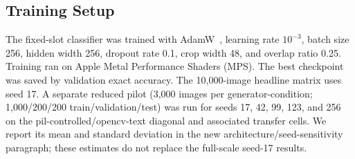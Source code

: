 \documentclass[pdflatex,sn-mathphys-num,iicol]{sn-jnl}
\begin{document}
\begin{table}[!htbp]
\centering
\caption{Full-scale benchmark configuration across all four generator families.
All distortion parameters are verified at the pixel level via the honesty
verifier (Section~\ref{sec:honesty}). This constitutes the CAPTCHA-X benchmark.}
\label{tab:benchmark}
\end{table}

\subsection{Training Setup}

The fixed-slot classifier was trained with AdamW~\cite{loshchilov2019decoupled}, learning rate $10^{-3}$, batch size 256, hidden width 256, dropout rate 0.1, crop width 48, and overlap ratio 0.25. Training ran on Apple Metal Performance Shaders (MPS). The best checkpoint was saved by validation exact accuracy. The 10,000-image headline matrix uses seed 17. A separate reduced pilot (3,000 images per generator-condition; 1,000/200/200 train/validation/test) was run for seeds 17, 42, 99, 123, and 256 on the pil-controlled/opencv-text diagonal and associated transfer cells. We report its mean and standard deviation in the new architecture/seed-sensitivity paragraph; these estimates do not replace the full-scale seed-17 results.
\end{document}
